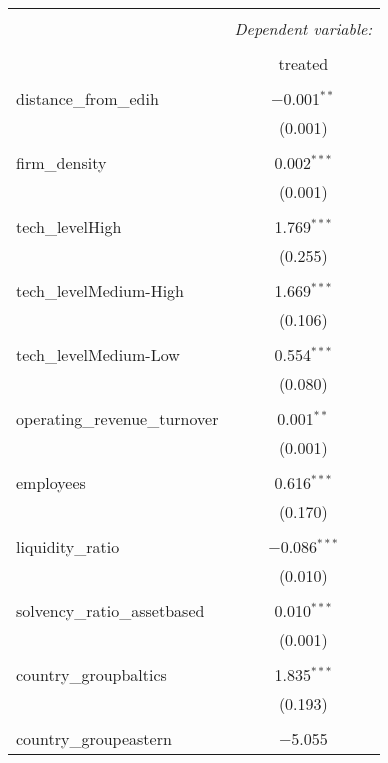 
\begin{table}[!htbp] \centering 
  \caption{} 
  \label{} 
\begin{tabular}{@{\extracolsep{5pt}}lc} 
\\[-1.8ex]\hline 
\hline \\[-1.8ex] 
 & \multicolumn{1}{c}{\textit{Dependent variable:}} \\ 
\cline{2-2} 
\\[-1.8ex] & treated \\ 
\hline \\[-1.8ex] 
 distance\_from\_edih & $-$0.001$^{**}$ \\ 
  & (0.001) \\ 
  & \\ 
 firm\_density & 0.002$^{***}$ \\ 
  & (0.001) \\ 
  & \\ 
 tech\_levelHigh & 1.769$^{***}$ \\ 
  & (0.255) \\ 
  & \\ 
 tech\_levelMedium-High & 1.669$^{***}$ \\ 
  & (0.106) \\ 
  & \\ 
 tech\_levelMedium-Low & 0.554$^{***}$ \\ 
  & (0.080) \\ 
  & \\ 
 operating\_revenue\_turnover & 0.001$^{**}$ \\ 
  & (0.001) \\ 
  & \\ 
 employees & 0.616$^{***}$ \\ 
  & (0.170) \\ 
  & \\ 
 liquidity\_ratio & $-$0.086$^{***}$ \\ 
  & (0.010) \\ 
  & \\ 
 solvency\_ratio\_assetbased & 0.010$^{***}$ \\ 
  & (0.001) \\ 
  & \\ 
 country\_groupbaltics & 1.835$^{***}$ \\ 
  & (0.193) \\ 
  & \\ 
 country\_groupeastern & $-$5.055 \\ 

\end{tabular}
\end{table}
